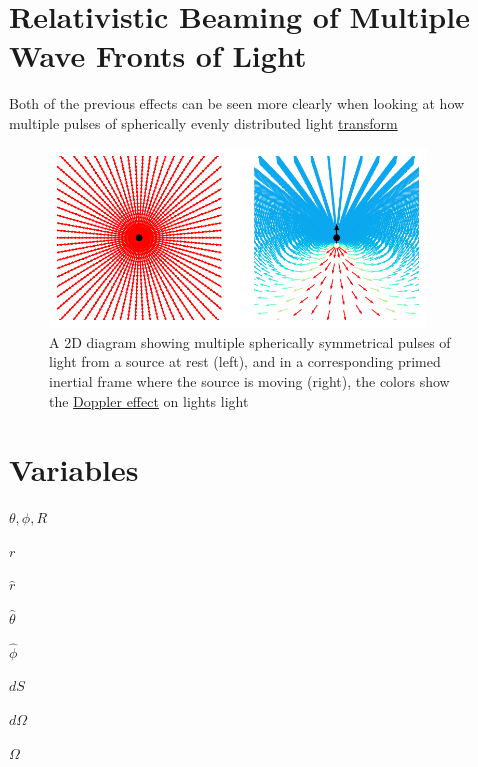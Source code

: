 \section{Relativistic Beaming of Multiple Wave Fronts of Light}

Both of the previous effects can be seen more clearly when looking at how multiple pulses of spherically evenly distributed light \hyperlink{def-transform}{transform}
\begin{figure}[ht]
	\centering
	\includegraphics[width=10cm]{images/pdf/Still_Retarded_Field_Both_Frames.pdf}
	\caption{A 2D diagram showing multiple spherically symmetrical pulses of light from a source at rest  (left), and in a corresponding primed inertial frame where the source is moving (right), the colors show the \protect\hyperlink{def-doppler-effect}{Doppler effect} on lights light}
	\label{fig: full field transformation}
\end{figure}

\section{Variables}

$\theta, \phi, R$ \newline

$r$ \newline

$\hat{r}$ \newline

$\hat{\theta}$ \newline

$\hat{\phi}$ \newline

$dS$ \newline

$d\Omega$ \newline

$\Omega$ \newline

